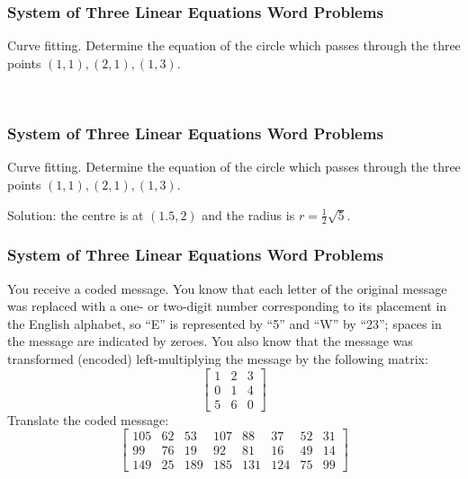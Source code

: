 \documentclass[xcolor=dvipsnames]{beamer}
\begin{document}
\begin{frame}
  \frametitle{System of Three Linear Equations Word Problems}
  {\ubung} Curve fitting. Determine the equation of the circle which
  passes through the three points $(1,1),(2,1),(1,3)$.

  \medskip
  
  \textcolor{white}{Solution: the centre is at $(1.5,2)$ and the
    radius is $r=\frac{1}{2}\sqrt{5}$.}
\end{frame}

\begin{frame}
  \frametitle{System of Three Linear Equations Word Problems}
\addtocounter{exercise}{-1}
  {\ubung} Curve fitting. Determine the equation of the circle which
  passes through the three points $(1,1),(2,1),(1,3)$.

  \medskip
  
  Solution: the centre is at $(1.5,2)$ and the
    radius is $r=\frac{1}{2}\sqrt{5}$.
\end{frame}

\begin{frame}
  \frametitle{System of Three Linear Equations Word Problems}
  {\ubung} You receive a coded message. You know that each letter of
  the original message was replaced with a one- or two-digit number
  corresponding to its placement in the English alphabet, so ``E'' is
  represented by ``5'' and ``W'' by ``23''; spaces in the message are
  indicated by zeroes. You also know that the message was transformed
  (encoded) left-multiplying the message by the following matrix:
\begin{equation}
  \label{eq:iephaeke}
  \left[
    \begin{array}{ccc}
    1 & 2  & 3  \\
    0 & 1  & 4  \\
    5 & 6  & 0 
  \end{array}\right]
\end{equation}
Translate the coded message:
\begin{equation}
  \label{eq:euseeyee}
  \left[
    \begin{array}{cccccccc}
    105   & 62 & 53  & 107 & 88  & 37  & 52 & 31 \\
    99    & 76 & 19  & 92  & 81  & 16  & 49 & 14 \\
    149   & 25 & 189 & 185 & 131 & 124 & 75 & 99
  \end{array}\right]
\end{equation}
\end{frame}
\end{document}
